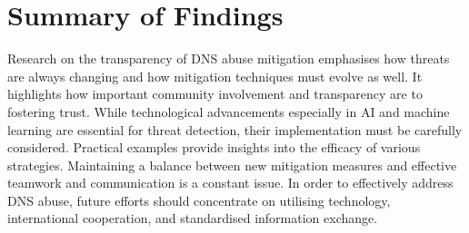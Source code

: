 \section{Summary of Findings}

Research on the transparency of DNS abuse mitigation emphasises how threats are always changing and how mitigation techniques must evolve as well. It highlights how important community involvement and transparency are to fostering trust. While technological advancements especially in AI and machine learning are essential for threat detection, their implementation must be carefully considered. Practical examples provide  insights into the efficacy of various strategies. Maintaining a balance between new mitigation measures and effective teamwork and communication is a constant issue. In order to effectively address DNS abuse, future efforts should concentrate on utilising technology, international cooperation, and standardised information exchange.






















